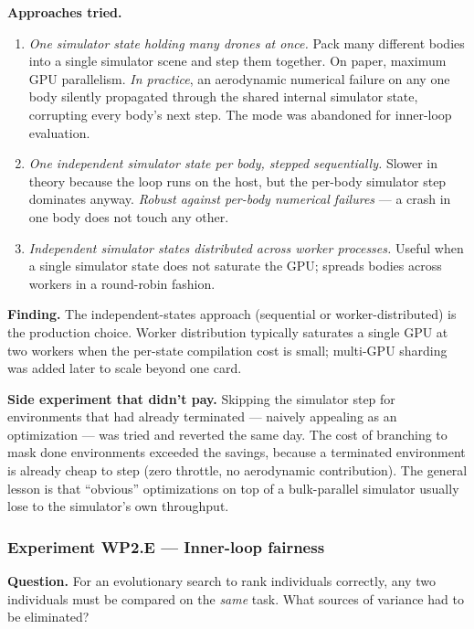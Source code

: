 \documentclass[letterpaper,10pt]{article}
\begin{document}
\textbf{Approaches tried.}
\begin{enumerate}
    \item \emph{One simulator state holding many drones at once.} Pack many different bodies into a single simulator scene and step them together. On paper, maximum GPU parallelism. \emph{In practice}, an aerodynamic numerical failure on any one body silently propagated through the shared internal simulator state, corrupting every body's next step. The mode was abandoned for inner-loop evaluation.
    \item \emph{One independent simulator state per body, stepped sequentially.} Slower in theory because the loop runs on the host, but the per-body simulator step dominates anyway. \emph{Robust against per-body numerical failures} --- a crash in one body does not touch any other.
    \item \emph{Independent simulator states distributed across worker processes.} Useful when a single simulator state does not saturate the GPU; spreads bodies across workers in a round-robin fashion.
\end{enumerate}

\textbf{Finding.} The independent-states approach (sequential or worker-distributed) is the production choice. Worker distribution typically saturates a single GPU at two workers when the per-state compilation cost is small; multi-GPU sharding was added later to scale beyond one card.

\textbf{Side experiment that didn't pay.} Skipping the simulator step for environments that had already terminated --- naively appealing as an optimization --- was tried and reverted the same day. The cost of branching to mask done environments exceeded the savings, because a terminated environment is already cheap to step (zero throttle, no aerodynamic contribution). The general lesson is that ``obvious'' optimizations on top of a bulk-parallel simulator usually lose to the simulator's own throughput.

\subsubsection{Experiment WP2.E --- Inner-loop fairness}
\textbf{Question.} For an evolutionary search to rank individuals correctly, any two individuals must be compared on the \emph{same} task. What sources of variance had to be eliminated?
\end{document}
